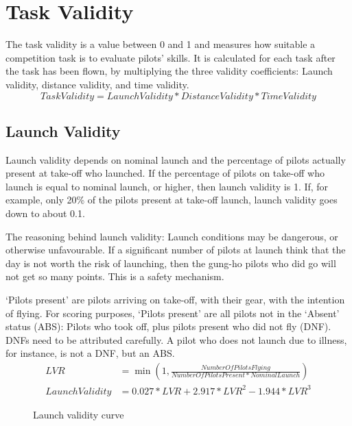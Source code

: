\documentclass{article}
\begin{document}
\newpage
\section{Task Validity}
\label{sec:task-validity}
The task validity is a value between 0 and 1 and measures how suitable
a competition task is to evaluate pilots’ skills. It is calculated for each
task after the task has been flown, by multiplying the three validity
coefficients: Launch validity, distance validity, and time validity.
\begin{equation*}
    TaskValidity = LaunchValidity * DistanceValidity * TimeValidity
\end{equation*}

\subsection{Launch Validity}
\label{sec:launch-validity}
Launch validity depends on nominal launch and the percentage of pilots actually
present at take-off who launched. If the percentage of pilots on take-off who
launch is equal to nominal launch, or higher, then launch validity is 1. If,
for example, only 20\% of the pilots present at take-off launch, launch
validity goes down to about 0.1.

The reasoning behind launch validity: Launch conditions may be dangerous, or
otherwise unfavourable.  If a significant number of pilots at launch think that
the day is not worth the risk of launching, then the gung-ho pilots who did go
will not get so many points. This is a safety mechanism.

‘Pilots present’ are pilots arriving on take-off, with their gear, with the
intention of flying. For scoring purposes, ‘Pilots present’ are all pilots not
in the ‘Absent’ status (ABS): Pilots who took off, plus pilots present who did
not fly (DNF). DNFs need to be attributed carefully. A pilot who does not
launch due to illness, for instance, is not a DNF, but an ABS.
\begin{align*}
    LVR &= \min(1, \frac{NumberOfPilotsFlying}{NumberOfPilotsPresent * NominalLaunch}) \\
    LaunchValidity &= 0.027 * LVR + 2.917 * LVR^2 - 1.944 * LVR^3
\end{align*}

\begin{figure}[h!]
    \centering
    
    \caption{Launch validity curve}
\end{figure}
\end{document}
